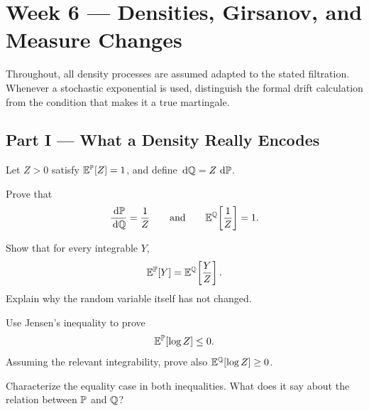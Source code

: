 \section{Week 6 --- Densities, Girsanov, and Measure Changes}

Throughout, all density processes are assumed adapted to the stated
filtration. Whenever a stochastic exponential is used, distinguish the
formal drift calculation from the condition that makes it a true martingale.

\subsection*{Part I --- What a Density Really Encodes}

\begin{exercise}
Let \(Z>0\) satisfy \(\mathbb{E}^{\mathbb{P}}[Z]=1\), and define
\(\,\mathrm{d}\mathbb{Q}=Z\,\,\mathrm{d}\mathbb{P}\).
\begin{exparts}
  \item Prove that
  \[
  \frac{\,\mathrm{d}\mathbb{P}}{\,\mathrm{d}\mathbb{Q}}=\frac1Z
  \qquad\text{and}\qquad
  \mathbb{E}^{\mathbb{Q}}\!\left[\frac1Z\right]=1.
  \]
  \item Show that for every integrable \(Y\),
  \[
  \mathbb{E}^{\mathbb{P}}[Y]=\mathbb{E}^{\mathbb{Q}}\!\left[\frac{Y}{Z}\right].
  \]
  Explain why the random variable itself has not changed.
  \item Use Jensen's inequality to prove
  \[
  \mathbb{E}^{\mathbb{P}}[\log Z]\leq0.
  \]
  Assuming the relevant integrability, prove also
  \(\mathbb{E}^{\mathbb{Q}}[\log Z]\geq0\).
  \item Characterize the equality case in both inequalities. What does it
  say about the relation between \(\mathbb{P}\) and \(\mathbb{Q}\)?
\end{exparts}
\end{exercise}

